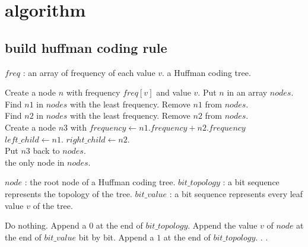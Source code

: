 \section{algorithm}

\subsection{build huffman coding rule}

\begin{algorithm}
	\caption{Build a Huffman coding tree}
	
	\begin{algorithmic}[1]
		\Require $freq$ : an array of frequency of each value $v$.
		\Ensure a Huffman coding tree.
		
				\State Create a node $n$ with frequency $freq[v]$ and value $v$.
				\State Put $n$ in an array $nodes$.
			\EndFor
			\\
				\State Find $n1$ in $nodes$ with the least frequency.
				\State Remove $n1$ from $nodes$.
				\\
				\State Find $n2$ in $nodes$ with the least frequency.
				\State Remove $n2$ from $nodes$.
				\\
				\State Create a node $n3$ with 
					\State\hspace{\algorithmicindent} $frequency \leftarrow n1.frequency + n2.frequency$
					\State\hspace{\algorithmicindent} $left\_child \leftarrow n1$.
					\State\hspace{\algorithmicindent} $right\_child \leftarrow n2$.
				\\
				\State Put $n3$ back to $nodes$.
			\EndWhile
			\\
			\State \Return the only node in $nodes$.
		\EndFunction
	\end{algorithmic}
\end{algorithm}



\begin{algorithm}
	\caption{Serialize a Huffman coding tree}
	
	\begin{algorithmic}[1]
		\Require $node$ : the root node of a Huffman coding tree.
		\Ensure $bit\_topology$ : a bit sequence represents the topology of the tree.
		\Ensure $bit\_value$ : a bit sequence represents every leaf value $v$ of the tree.
		
				\State Do nothing.
				\State Append a $0$ at the end of $bit\_topology$.
				\State Append the value $v$ of $node$ at the end of $bit\_value$ bit by bit.
			\Else
				\State Append a $1$ at the end of $bit\_topology$.
				\State {}.
				\State {}.
			\EndIf
		\EndProcedure
	\end{algorithmic}
\end{algorithm}

